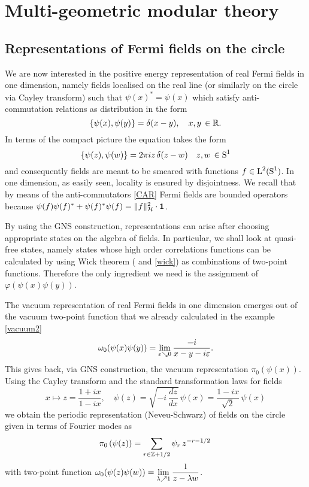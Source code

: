 \chapter{Multi-geometric modular theory}
         \label{ch:multi-geometric}
\minitoc\mtcskip

 \section{Representations of Fermi fields on the circle}
 \label{repn of Fermi on the circle}
 We are now interested in the positive energy representation
 of real Fermi fields in one dimension, namely fields localised
 on the real line (or similarly on the circle via Cayley
 transform) such that $\psi(x)^*=\psi(x)$ which satisfy 
 anti-commutation relations as distribution in the form
 \[
 \{\psi(x),\psi(y)\}=\delta(x-y),\quad x,y\,\in\mathbb{R}.
 \]
 In terms of the compact picture the equation takes the
 form
 \[
 \{\psi(z),\psi(w)\}=2\pi iz\,\delta(z-w)\quad z,w\,\in\textrm{S}^1
 \]
 and consequently fields are meant to be smeared with
 functions $f\in\textrm{L}^2(\textrm{S}^1)$. In one dimension, as easily seen,
 locality is ensured by disjointness. We recall that by means
 of the anti-commutators
 \eqref{CAR} Fermi fields are bounded operators because 
 $\psi(f)\psi(f)^*+\psi(f)^*\psi(f)=\lVert f\rVert^2_{\mathcal{H}}\cdot 
 \bm{1}$.
 
 \bigskip
 By using the \ac{GNS} construction, representations can arise
 after choosing appropriate states on the algebra of fields. In
 particular, we shall look at quasi-free states, namely
 states whose high order correlations functions can be
 calculated by using Wick theorem (\cite{BR:1979} and
 \eqref{wick}) as combinations of two-point functions. 
 Therefore the only ingredient we need is the assignment 
 of $\varphi(\psi(x)\psi(y))$.
 
 The vacuum representation of real Fermi fields
 in one dimension emerges out of the vacuum two-point
 function that we already calculated in the
 example \eqref{vacuum2}
 \begin{equation*}
 \omega_0(\psi(x)\psi(y))=\lim_{\varepsilon\searrow 0}
 \frac{-i}{x-y-i\varepsilon}.
 \end{equation*}
 This gives back, via \ac{GNS} construction, the vacuum 
 representation $\pi_0(\psi(x))$. Using the Cayley
 transform and the standard transformation laws for fields
 \[
 x\mapsto z=\frac{1+ix}{1-ix},\quad
 \psi(z)=\sqrt{-i\,\frac{dz}{dx}}\,\psi(x)=
 \frac{1-ix}{\sqrt{2}}\,\psi(x)
 \]
 we obtain the periodic representation (Neveu-Schwarz) 
 of fields on the circle given
 in terms of Fourier modes as
\[
\pi_0\left(\psi(z)\right)=\sum_{r\in\mathbb{Z}+1/2}\psi_r\,
z^{-r-1/2}\,
\]
 with two-point function $\omega_0(\psi(z)\psi(w))=
 \displaystyle{\lim_{\lambda\nearrow 1} \frac{1}{z-\lambda w}}$.
  
